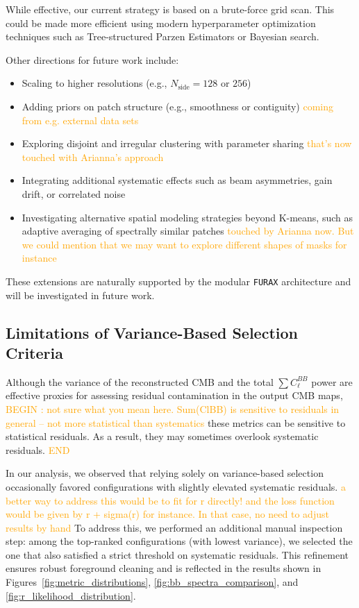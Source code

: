 \documentclass[fleqn,usenatbib]{mnras}
\newcommand{\je}[1]{\textcolor{orange}{#1}}
\begin{document}
While effective, our current strategy is based on a brute-force grid scan. This could be made more efficient using modern hyperparameter optimization techniques such as Tree-structured Parzen Estimators or Bayesian search.

Other directions for future work include:
\begin{itemize}
    \item Scaling to higher resolutions (e.g., \( N_{\text{side}} = 128 \) or \( 256 \))
    \item Adding priors on patch structure (e.g., smoothness or contiguity) \je{coming from e.g. external data sets}
    \item Exploring disjoint and irregular clustering with parameter sharing \je{that's now touched with Arianna's approach}
    \item Integrating additional systematic effects such as beam asymmetries, gain drift, or correlated noise
    \item Investigating alternative spatial modeling strategies beyond K-means, such as adaptive averaging of spectrally similar patches \je{touched by Arianna now. But we could mention that we may want to explore different shapes of masks for instance}
\end{itemize}


These extensions are naturally supported by the modular \texttt{FURAX} architecture and will be investigated in future work.

\subsection*{Limitations of Variance-Based Selection Criteria}

Although the variance of the reconstructed CMB and the total $\sum C_\ell^{BB}$ power are effective proxies for assessing residual contamination in the output CMB maps, \je{BEGIN : not sure what you mean here. Sum(ClBB) is sensitive to residuals in general -- not more statistical than systematics} these metrics can be sensitive to statistical residuals. As a result, they may sometimes overlook systematic residuals. \je{END}

In our analysis, we observed that relying solely on variance-based selection occasionally favored configurations with slightly elevated systematic residuals. \je{a better way to address this would be to fit for r directly! and the loss function would be given by r + sigma(r) for instance.  In that case, no need to adjust results by hand} To address this, we performed an additional manual inspection step: among the top-ranked configurations (with lowest variance), we selected the one that also satisfied a strict threshold on systematic residuals. This refinement ensures robust foreground cleaning and is reflected in the results shown in Figures~\ref{fig:metric_distributions}, \ref{fig:bb_spectra_comparison}, and \ref{fig:r_likelihood_distribution}.
\end{document}
